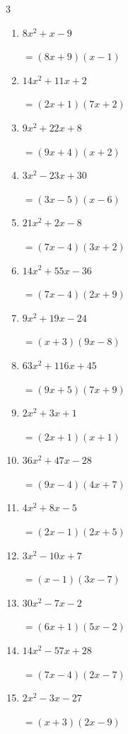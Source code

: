 \begin{multicols}{3}
\begin{enumerate}
        $=(x+1)(x-1)$

  \item $8x^{2}+x-9$

        $=(8x+9)(x-1)$

  \item $14x^{2}+11x+2$

        $=(2x+1)(7x+2)$

  \item $9x^{2}+22x+8$

        $=(9x+4)(x+2)$

  \item $3x^{2}-23x+30$

        $=(3x-5)(x-6)$

  \item $21x^{2}+2x-8$

        $=(7x-4)(3x+2)$

\columnbreak %

  \item $14x^{2}+55x-36$

        $=(7x-4)(2x+9)$

  \item $9x^{2}+19x-24$

        $=(x+3)(9x-8)$

  \item $63x^{2}+116x+45$

        $=(9x+5)(7x+9)$

  \item $2x^{2}+3x+1$

        $=(2x+1)(x+1)$

  \item $36x^{2}+47x-28$

        $=(9x-4)(4x+7)$

  \item $4x^{2}+8x-5$

        $=(2x-1)(2x+5)$

  \item $3x^{2}-10x+7$

        $=(x-1)(3x-7)$

  \item $30x^{2}-7x-2$

        $=(6x+1)(5x-2)$

  \item $14x^{2}-57x+28$

        $=(7x-4)(2x-7)$

  \item $2x^{2}-3x-27$

        $=(x+3)(2x-9)$


\end{enumerate}
\end{multicols}
